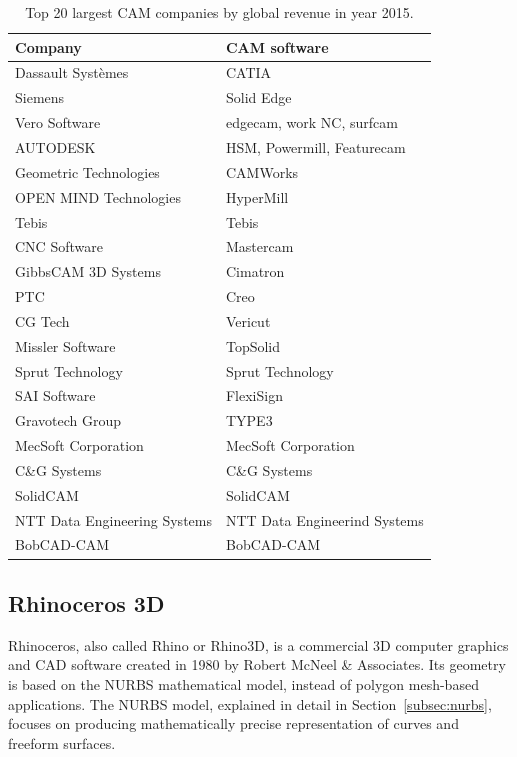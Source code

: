 	\begin{table}
	\centering
	\captionsetup{justification=centering}
	\begin{tabular}{l | l}
	\hline
	\textbf{Company} & \textbf{CAM software}\\\hline
	Dassault Syst{\`e}mes & CATIA\\
	Siemens & Solid Edge\\
	Vero Software & edgecam, work NC, surfcam\\
	AUTODESK & HSM, Powermill, Featurecam\\
	Geometric Technologies & CAMWorks\\
	OPEN MIND Technologies & HyperMill\\
	Tebis & Tebis\\
	CNC Software & Mastercam\\
	GibbsCAM 3D Systems & Cimatron\\
	PTC & Creo\\
	CG Tech & Vericut\\
	Missler Software & TopSolid\\
	Sprut Technology & Sprut Technology\\
	SAI Software & FlexiSign\\
	Gravotech Group & TYPE3\\
	MecSoft Corporation & MecSoft Corporation\\
	C\&G Systems & C\&G Systems\\
	SolidCAM & SolidCAM\\
	NTT Data Engineering Systems & NTT Data Engineerind Systems\\
	BobCAD-CAM & BobCAD-CAM\\
	\hline
	\end{tabular}
	\caption{Top 20 largest CAM companies by  global revenue in year 2015.}
	\label{tab:listcam}
	\end{table}
	
	\subsection{Rhinoceros 3D}
	
	Rhinoceros, also called Rhino or Rhino3D, is a commercial 3D computer graphics and CAD software created in 1980 by Robert McNeel \& Associates. Its geometry is based on the NURBS mathematical model, instead of polygon mesh-based applications. The NURBS model, explained in detail in Section~\ref{subsec:nurbs}, focuses on producing mathematically precise representation of curves and freeform surfaces.
	
